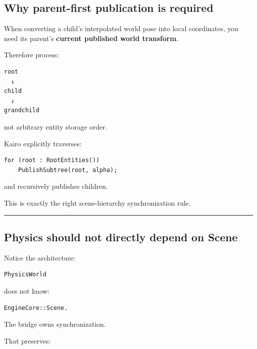 \subsection{Why parent-first publication is required}\label{06-engine-ii-ch037-why-parent-first-publication-is-required}

\hypertarget{06-engine-ii-ch037-why-parent-first-publication-is-required}{}

When converting a child's interpolated world pose into local coordinates, you need its parent's \textbf{current published world transform}.

Therefore process:

\begin{verbatim}
root
  ↓
child
  ↓
grandchild
\end{verbatim}

not arbitrary entity storage order.

Kairo explicitly traverses:

\begin{verbatim}
for (root : RootEntities())
    PublishSubtree(root, alpha);
\end{verbatim}

and recursively publishes children.

This is exactly the right scene-hierarchy synchronization rule.

\begin{center}\rule{0.5\linewidth}{0.5pt}\end{center}

\subsection{Physics should not directly depend on Scene}\label{06-engine-ii-ch037-physics-should-not-directly-depend-on-scene}

\hypertarget{06-engine-ii-ch037-physics-should-not-directly-depend-on-scene}{}

Notice the architecture:

\begin{verbatim}
PhysicsWorld
\end{verbatim}

does not know:

\begin{verbatim}
EngineCore::Scene.
\end{verbatim}

The bridge owns synchronization.

That preserves:

